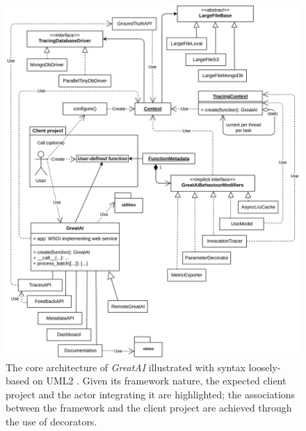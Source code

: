\begin{figure}
    \centering
    \includegraphics[width=\linewidth]{figures/architecture.png}
    \captionsetup{width=.9\linewidth}
    \caption{The core architecture of \textit{GreatAI} illustrated with syntax loosely-based on UML2 \cite{Rumbaugh2004}. Given its framework nature, the expected client project and the actor integrating it are highlighted; the associations between the framework and the client project are achieved through the use of decorators.}
    \label{fig:architecture}
\end{figure}
